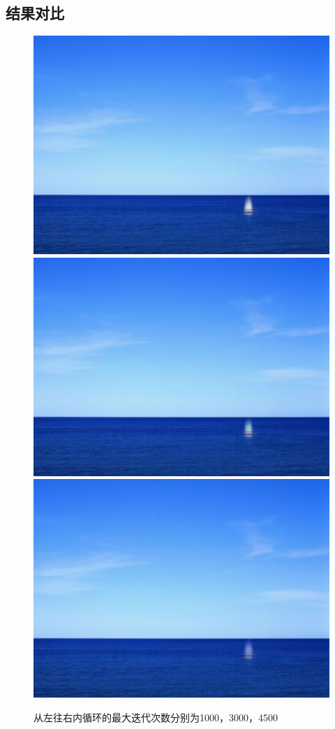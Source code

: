 \documentclass{article}
\begin{document}
    \subsection{结果对比}
    \begin{figure}[h]
    	\includegraphics[scale=0.28]{../figures/A-2.png}
    	\quad
    	\includegraphics[scale=0.28]{../figures/A-3.png}
    	\quad
    	\includegraphics[scale=0.28]{../figures/A-0.png}
    	\caption{从左往右内循环的最大迭代次数分别为1000，3000，4500}
    \end{figure}
\end{document}
